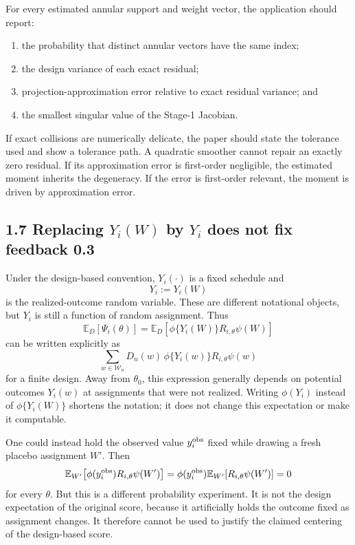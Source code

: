 \documentclass[11pt]{article}
\newcommand{\E}{\mathbb{E}}
\begin{document}
For every estimated annular support and weight vector, the application should
report:
\begin{enumerate}[leftmargin=2em]
    \item the probability that distinct annular vectors have the same index;
    \item the design variance of each exact residual;
    \item projection-approximation error relative to exact residual variance;
    and
    \item the smallest singular value of the Stage-1 Jacobian.
\end{enumerate}
If exact collisions are numerically delicate, the paper should state the
tolerance used and show a tolerance path. A quadratic smoother cannot repair
an exactly zero residual. If its approximation error is first-order
negligible, the estimated moment inherits the degeneracy. If the error is
first-order relevant, the moment is driven by approximation error.

\subsection*{1.7 Replacing \(Y_i(W)\) by \(Y_i\) does not fix feedback 0.3}

Under the design-based convention, \(Y_i(\cdot)\) is a fixed schedule and
\[
    Y_i:=Y_i(W)
\]
is the realized-outcome random variable. These are different notational
objects, but \(Y_i\) is still a function of random assignment. Thus
\[
    \E_D[\Psi_i(\theta)]
    =
    \E_D\!\left[
       \phi\{Y_i(W)\}R_{i,\theta}\psi(W)
    \right]
\]
can be written explicitly as
\[
    \sum_{w\in\mathcal W_n}
       D_n(w)\,
       \phi\{Y_i(w)\}
       R_{i,\theta}\psi(w)
\]
for a finite design. Away from \(\theta_0\), this expression generally depends
on potential outcomes \(Y_i(w)\) at assignments that were not realized.
Writing \(\phi(Y_i)\) instead of \(\phi\{Y_i(W)\}\) shortens the notation; it
does not change this expectation or make it computable.

One could instead hold the observed value \(y_i^{\rm obs}\) fixed while drawing
a fresh placebo assignment \(W'\). Then
\[
    \E_{W'}\!\left[
       \phi(y_i^{\rm obs})R_{i,\theta}\psi(W')
    \right]
    =
    \phi(y_i^{\rm obs})
    \E_{W'}[R_{i,\theta}\psi(W')]
    =
    0
\]
for every \(\theta\). But this is a different probability experiment. It is
not the design expectation of the original score, because it artificially
holds the outcome fixed as assignment changes. It therefore cannot be used to
justify the claimed centering of the design-based score.
\end{document}
